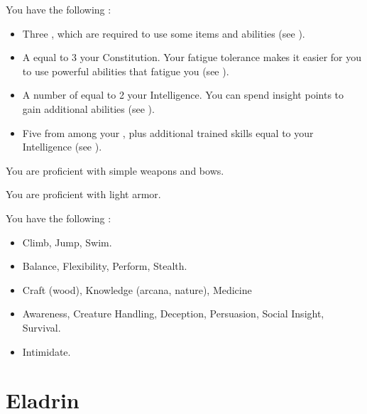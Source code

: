          You have the following :
        \begin{itemize}
            \item Three , which are required to use some items and abilities (see ).
            \item A  equal to 3 \add your Constitution.
                Your fatigue tolerance makes it easier for you to use powerful abilities that fatigue you (see ).
            \item A number of  equal to 2 \add your Intelligence.
                You can spend insight points to gain additional abilities (see ).
            \item Five  from among your , plus additional trained skills equal to your Intelligence (see ).
        \end{itemize}

        You are proficient with simple weapons and bows.

        You are proficient with light armor.

        You have the following :
        \begin{itemize}
            \item {} Climb, Jump, Swim.
            \item {} Balance, Flexibility, Perform, Stealth.
            \item {} Craft (wood), Knowledge (arcana, nature), Medicine
            \item {} Awareness, Creature Handling, Deception, Persuasion, Social Insight, Survival.
            \item {} Intimidate.
        \end{itemize}

\section{Eladrin}

